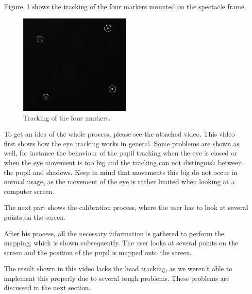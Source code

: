 
Figure~\ref{fig:headmarkers} shows the tracking of the four markers mounted on the spectacle frame.

\begin{figure}[h]
  \centering
  \includegraphics[width=0.5\textwidth]{fin_head.png}
  \caption{Tracking of the four markers.}\label{fig:headmarkers}
\end{figure}

To get an idea of the whole process, please see the attached video. This video first shows how the eye tracking works in general. Some problems are shown as well, for instance the behaviour of the pupil tracking when the eye is closed or when the eye movement is too big and the tracking can not distinguish between the pupil and shadows. Keep in mind that movements this big do not occur in normal usage, as the movement of the eye is rather limited when looking at a computer screen.

The next part shows the calibration process, where the user has to look at several points on the screen.

After his process, all the necessary information is gathered to perform the mapping, which is shown subsequently. The user looks at several points on the screen and the position of the pupil is mapped onto the screen. 

The result shown in this video lacks the head tracking, as we weren't able to implement this properly due to several tough problems. These problems are discussed in the next section.


